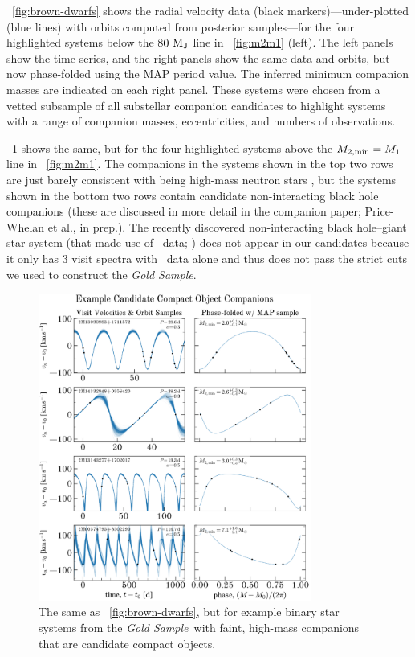 \documentclass[modern]{aastex63}
\newcommand{\goldsample}{\textit{Gold Sample}}
\begin{document}
\figurename~\ref{fig:brown-dwarfs} shows the radial velocity data (black
markers)---under-plotted (blue lines) with orbits computed from posterior
samples---for the four highlighted systems below the $80~\mathrm{M}_{\mathrm{J}}$ line in
\figurename~\ref{fig:m2m1} (left).
The left panels show the time series, and the right panels show the same data
and orbits, but now phase-folded using the MAP period value.
The inferred minimum companion masses are indicated on each right panel.
These systems were chosen from a vetted subsample of all substellar companion
candidates to highlight systems with a range of companion masses,
eccentricities, and numbers of observations.

\figurename~\ref{fig:compact-objects} shows the same, but for the four
highlighted systems above the $M_{2, {\rm min}} = M_1$ line in
\figurename~\ref{fig:m2m1}.
The companions in the systems shown in the top two rows are just barely
consistent with being high-mass neutron stars \citep[e.g.,][]{Cromartie:2019},
but the systems shown in the bottom two rows contain candidate non-interacting
black hole companions (these are discussed in more detail in the companion
paper; Price-Whelan et al., in prep.).
The recently discovered non-interacting black hole--giant star system (that made
use of \apogee\ data; \citealt{Thompson:2019}) does not appear in our candidates
because it only has 3 visit spectra with \apogee\ data alone and thus does not
pass the strict cuts we used to construct the \goldsample.

\begin{figure}[!t]
    \begin{center}
    \includegraphics[width=0.8\textwidth]{example-compact-objects.pdf}
    \end{center}
    \caption{%
    The same as \figurename~\ref{fig:brown-dwarfs}, but for example binary star
    systems from the \goldsample\ with faint, high-mass companions that are
    candidate compact objects.
    \label{fig:compact-objects}
    }
\end{figure}
\end{document}
